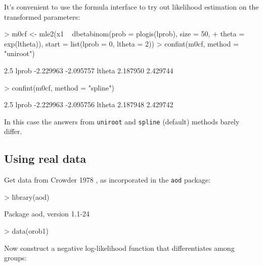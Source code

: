 \documentclass{article}
\newcommand{\code}[1]{{\tt #1}}
\begin{document}
It's convenient to use the formula interface
to try out likelihood estimation on the
transformed parameters:
\begin{Schunk}
\begin{Sinput}
> m0cf <- mle2(x1 ~ dbetabinom(prob = plogis(lprob), size = 50, 
+     theta = exp(ltheta)), start = list(lprob = 0, ltheta = 2))
> confint(m0cf, method = "uniroot")
\end{Sinput}
\begin{Soutput}
           2.5 %
lprob  -2.229963 -2.095757
ltheta  2.187950  2.429744
\end{Soutput}
\begin{Sinput}
> confint(m0cf, method = "spline")
\end{Sinput}
\begin{Soutput}
           2.5 %
lprob  -2.229963 -2.095756
ltheta  2.187948  2.429742
\end{Soutput}
\end{Schunk}

In this case the answers from \code{uniroot}
and \code{spline} (default) methods barely
differ.

\subsection{Using real data}
Get data from Crowder 1978 \cite{Crowder1978},
as incorporated in the \code{aod} package:
\begin{Schunk}
\begin{Sinput}
> library(aod)
\end{Sinput}
\begin{Soutput}
Package aod, version 1.1-24 
\end{Soutput}
\begin{Sinput}
> data(orob1)
\end{Sinput}
\end{Schunk}

Now construct a negative log-likelihood
function that differentiates among groups:
\begin{Schunk}
\end{Schunk}
\end{document}
